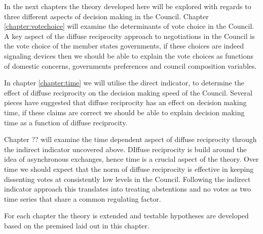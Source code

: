In the next chapters the theory developed here will be explored with regards to three different aspects of decision making in the Council. Chapter \ref{chapter:votechoice} will examine the determinants of vote choice in the Council. A key aspect of the diffuse reciprocity approach to negotiations in the Council is the vote choice of the member states governments, if these choices are indeed signaling devices then we should be able to explain the vote choices as functions of domestic concerns, governments preferences and council composition variables.

In chapter \ref{chapter:time} we will utilise the direct indicator, to determine the effect of diffuse reciprocity on the decision making speed of the Council. Several pieces have suggested that diffuse reciprocity has an effect on decision making time, if these claims are correct we should be able to explain decision making time as a function of diffuse reciprocity.

Chapter ?? will examine the time dependent aspect of diffuse reciprocity through the indirect indicator uncovered above. DIffuse reciprocity is build around the idea of asynchronous exchanges, hence time is a crucial aspect of the theory. Over time we should expect that the norm of diffuse reciprocity is effective in keeping dissenting votes at consistently low levels in the Council. Following the indirect indicator approach this translates into treating abstentions and no votes as two time series that share a common regulating factor. 

For each chapter the theory is extended and testable hypotheses are developed based on the premised laid out in this chapter. 

